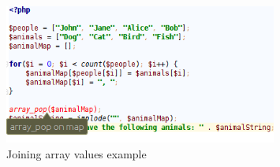\begin{figure}
\centering
\includegraphics[width=0.8\textwidth]{chapters/caseStudy/newScreens/joinArray}
\caption{Joining array values example}
\label{fig:arrayPopScreenshot}
\end{figure}





